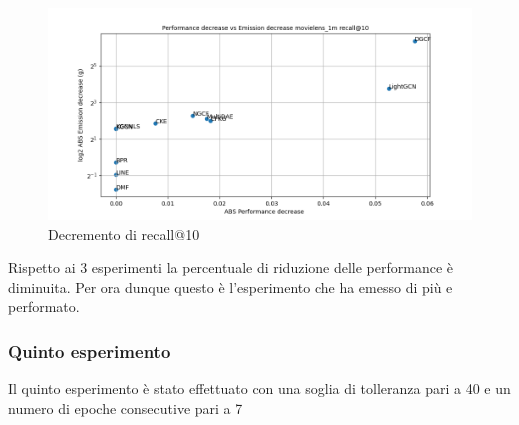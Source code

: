 \begin{figure}[H]
    \centering
     \includegraphics[width=\textwidth]{images/decrement_recall@10_movielens_1m_30_6.png}
    \caption{Decremento di recall@10}
\end{figure}

\noindent Rispetto ai 3 esperimenti la percentuale di riduzione delle performance è diminuita. Per ora dunque questo è l'esperimento che ha emesso di più e performato.

\subsubsection{Quinto esperimento}

Il quinto esperimento è stato effettuato con una soglia di tolleranza pari a 40 e un numero di epoche consecutive pari a 7


